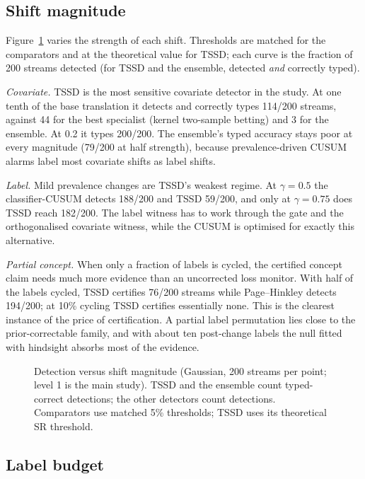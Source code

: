 \subsection{Shift magnitude}
\label{sec:magnitude}

Figure~\ref{fig:magnitude} varies the strength of each shift. Thresholds are matched for the comparators and at the theoretical value for TSSD; each curve is the fraction of 200 streams detected (for TSSD and the ensemble, detected \emph{and} correctly typed).

\emph{Covariate.} TSSD is the most sensitive covariate detector in the study. At one tenth of the base translation it detects and correctly types 114/200 streams, against 44 for the best specialist (kernel two-sample betting) and 3 for the ensemble. At 0.2 it types 200/200. The ensemble's typed accuracy stays poor at every magnitude (79/200 at half strength), because prevalence-driven CUSUM alarms label most covariate shifts as label shifts.

\emph{Label.} Mild prevalence changes are TSSD's weakest regime. At $\gamma=0.5$ the classifier-CUSUM detects 188/200 and TSSD 59/200, and only at $\gamma=0.75$ does TSSD reach 182/200. The label witness has to work through the gate and the orthogonalised covariate witness, while the CUSUM is optimised for exactly this alternative.

\emph{Partial concept.} When only a fraction of labels is cycled, the certified concept claim needs much more evidence than an uncorrected loss monitor. With half of the labels cycled, TSSD certifies 76/200 streams while Page--Hinkley detects 194/200; at 10\% cycling TSSD certifies essentially none. This is the clearest instance of the price of certification. A partial label permutation lies close to the prior-correctable family, and with about ten post-change labels the null fitted with hindsight absorbs most of the evidence.

\begin{figure}[t]
\centering

\caption{Detection versus shift magnitude (Gaussian, 200 streams per point; level 1 is the main study). TSSD and the ensemble count typed-correct detections; the other detectors count detections. Comparators use matched 5\% thresholds; TSSD uses its theoretical SR threshold.}
\label{fig:magnitude}
\end{figure}

\subsection{Label budget}
\label{sec:reveal}

